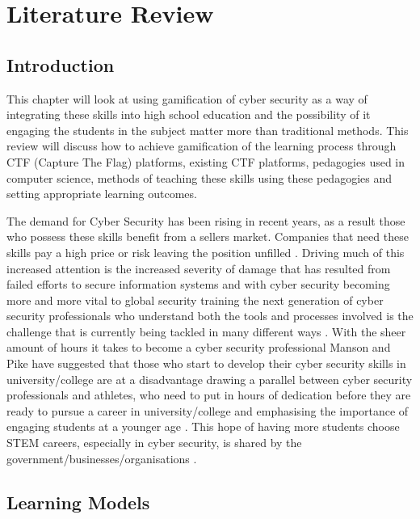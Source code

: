 \documentclass[12pt,a4paper]{article}
\begin{document}
\newpage

\section{Literature Review}
\subsection{Introduction}
This chapter will look at using gamification of cyber security as a way of integrating these skills into high school education and the possibility of it engaging the students in the subject matter more than traditional methods. This review will discuss how to achieve gamification of the learning process through CTF (Capture The Flag) platforms, existing CTF platforms, pedagogies used in computer science, methods of teaching these skills using these pedagogies and setting appropriate learning outcomes.  

The demand for Cyber Security has been rising in recent years, as a result those who possess these skills benefit from a sellers market. Companies that need these skills pay a high price or risk leaving the position unfilled \cite{libicki2014hackers}. Driving much of this increased attention is the increased severity of damage that has resulted from failed efforts to secure information systems \cite{albert2010high2} and with cyber security becoming more and more vital to global security \cite{nagarajan2012exploring6} training the next generation of cyber security professionals who understand both the tools and processes involved is the challenge that is currently being tackled in many different ways \cite{buchanan2011blending3}. With the sheer amount of hours it takes to become a cyber security professional Manson and Pike have suggested that those who start to develop their cyber security skills in university/college are at a disadvantage drawing a parallel between cyber security professionals and athletes, who need to put in hours of dedication before they are ready to pursue a career in university/college and emphasising the importance of engaging students at a younger age \cite{manson2014case}. This hope of having more students choose STEM careers, especially in cyber security, is shared by the government/businesses/organisations \cite{albert2010high4}. 

 
\subsection{Learning Models}
\end{document}
